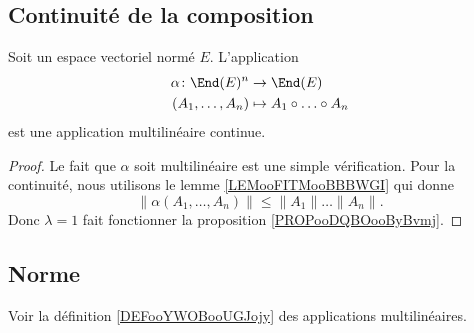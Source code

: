 \subsection{Continuité de la composition}

\begin{proposition}	\label{PROPooIPILooZMtYSP}
	Soit un espace vectoriel normé \( E\). L'application
	\begin{equation}
		\begin{aligned}
			\alpha\colon \End(E)^n & \to \End(E)                      \\
			(A_1,\ldots,A_n)       & \mapsto A_1\circ\ldots \circ A_n
		\end{aligned}
	\end{equation}
	est une application multilinéaire continue.
\end{proposition}

\begin{proof}
	Le fait que \( \alpha\) soit multilinéaire est une simple vérification. Pour la continuité, nous utilisons le lemme \ref{LEMooFITMooBBBWGI} qui donne
	\begin{equation}
		\| \alpha(A_1,\ldots,A_n) \|\leq \| A_1 \|\ldots \| A_n \|.
	\end{equation}
	Donc \( \lambda=1\) fait fonctionner la proposition \ref{PROPooDQBOooByBvmj}.
\end{proof}


\subsection{Norme}


Voir la définition \ref{DEFooYWOBooUGJojy} des applications multilinéaires.


